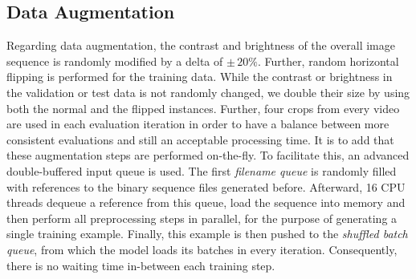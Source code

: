 \subsection{Data Augmentation}

Regarding data augmentation, the contrast and brightness of the overall image sequence is randomly modified by a delta of $ \pm\,20\% $. Further, random horizontal flipping is performed for the training data. While the contrast or brightness in the validation or test data is not randomly changed, we double their size by using both the normal and the flipped instances. Further, four crops from every video are used in each evaluation iteration in order to have a balance between more consistent evaluations and still an acceptable processing time. It is to add that these augmentation steps are performed on-the-fly. To facilitate this, an advanced double-buffered input queue is used. The first \textit{filename queue} is randomly filled with references to the binary sequence files generated before. Afterward, \num{16} CPU threads dequeue a reference from this queue, load the sequence into memory and then perform all preprocessing steps in parallel, for the purpose of generating a single training example. Finally, this example is then pushed to the \textit{shuffled batch queue}, from which the model loads its batches in every iteration. Consequently, there is no waiting time in-between each training step.
